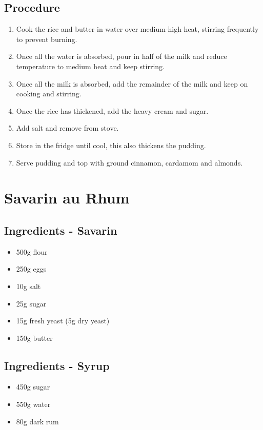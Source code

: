 \documentclass[10pt]{book}
\begin{document}
\subsection*{Procedure}
	\begin{enumerate}
		\item Cook the rice and butter in water over medium-high heat, stirring frequently to prevent burning.
		\item Once all the water is absorbed, pour in half of the milk and reduce temperature to medium heat and keep stirring.
		\item Once all the milk is absorbed, add the remainder of the milk and keep on cooking and stirring.
		\item Once the rice has thickened, add the heavy cream and sugar.
		\item Add salt and remove from stove.
		\item Store in the fridge until cool, this also thickens the pudding.
		\item Serve pudding and top with ground cinnamon, cardamom and almonds.
	\end{enumerate}
\newpage


\newpage
\section*{Savarin au Rhum}
\subsection*{Ingredients - Savarin}
	\begin{itemize}
		\item 500g flour
		\item 250g eggs
		\item 10g salt
		\item 25g sugar
		\item 15g fresh yeast (5g dry yeast)
		\item 150g butter
	\end{itemize}
\subsection*{Ingredients - Syrup}
	\begin{itemize}
		\item 450g sugar
		\item 550g water
		\item 80g dark rum
	\end{itemize}
\end{document}
